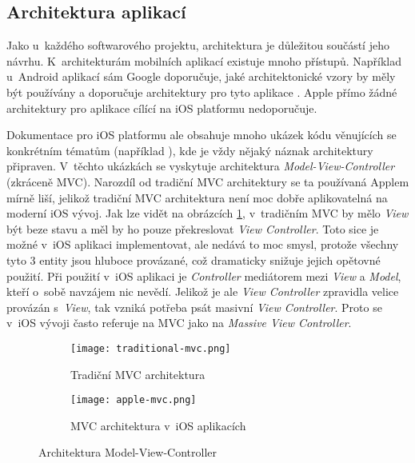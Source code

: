 \subsection{Architektura aplikací}\label{app-architecture}

Jako u~každého softwarového projektu, architektura je důležitou součástí jeho návrhu. K~architekturám mobilních aplikací existuje mnoho přístupů. Například u~Android aplikací sám Google doporučuje, jaké architektonické vzory by měly být používány a doporučuje architektury pro tyto aplikace \cite{android-app-arch}. Apple přímo žádné architektury pro aplikace cílící na iOS platformu nedoporučuje. 

Dokumentace pro iOS platformu ale obsahuje mnoho ukázek kódu věnujících se konkrétním tématům (například \cite{swift-ui-tutorial-complex-interfaces}), kde je vždy nějaký náznak architektury připraven. V~těchto ukázkách se vyskytuje architektura \emph{Model-View-Controller} (zkráceně MVC). Narozdíl od tradiční MVC architektury se ta používaná Applem mírně liší, jelikož tradiční MVC architektura není moc dobře aplikovatelná na moderní iOS vývoj. Jak lze vidět na obrázcích \ref{fig:mvc}, v~tradičním MVC by mělo \emph{View} být beze stavu a měl by ho pouze překreslovat \emph{View Controller}. Toto sice je možné v~iOS aplikaci implementovat, ale nedává to moc smysl, protože všechny tyto 3 entity jsou hluboce provázané, což dramaticky snižuje jejich opětovné použití. Při použití v~iOS aplikaci je \emph{Controller} mediátorem mezi \emph{View} a \emph{Model}, kteří o~sobě navzájem nic nevědí. Jelikož je ale \emph{View Controller} zpravidla velice provázán s~\emph{View}, tak vzniká potřeba psát masivní \emph{View Controller}. Proto se v~iOS vývoji často referuje na MVC jako na \emph{Massive View Controller}.

\begin{figure}[h]
	\centering
	\begin{subfigure}[b]{0.35\textwidth}
		\centering
		\texttt{[image: traditional-mvc.png]}
		\caption{Tradiční MVC architektura}
	\end{subfigure}
	\hspace{1cm}
	\begin{subfigure}[b]{0.45\textwidth}
		\centering
		\texttt{[image: apple-mvc.png]}
		\caption{MVC architektura v~iOS aplikacích}
	\end{subfigure}
	\caption{Architektura Model-View-Controller \cite{ios-architecture-patterns}}
	\label{fig:mvc}
\end{figure}

